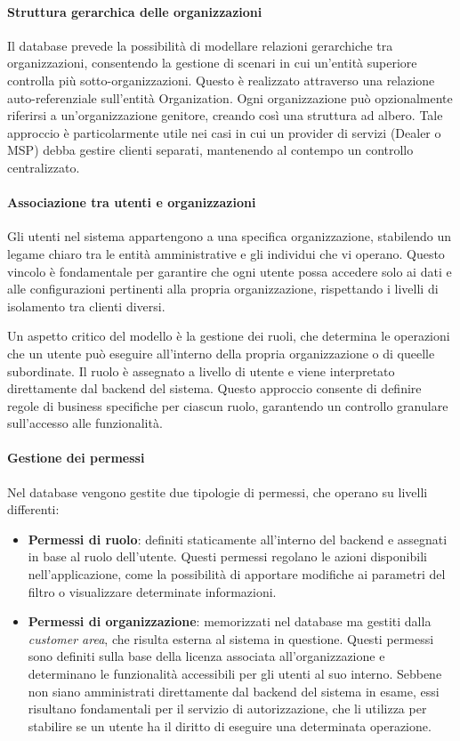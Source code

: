 \paragraph{Struttura gerarchica delle organizzazioni}
Il database prevede la possibilità di modellare relazioni gerarchiche tra organizzazioni, consentendo la gestione di scenari in cui un'entità superiore controlla più sotto-organizzazioni. Questo è realizzato attraverso una relazione auto-referenziale sull'entità Organization. Ogni organizzazione può opzionalmente riferirsi a un'organizzazione genitore, creando così una struttura ad albero. Tale approccio è particolarmente utile nei casi in cui un provider di servizi (Dealer o MSP) debba gestire clienti separati, mantenendo al contempo un controllo centralizzato.

\paragraph{Associazione tra utenti e organizzazioni}
Gli utenti nel sistema appartengono a una specifica organizzazione, stabilendo un legame chiaro tra le entità amministrative e gli individui che vi operano. Questo vincolo è fondamentale per garantire che ogni utente possa accedere solo ai dati e alle configurazioni pertinenti alla propria organizzazione, rispettando i livelli di isolamento tra clienti diversi.

Un aspetto critico del modello è la gestione dei ruoli, che determina le operazioni che un utente può eseguire all’interno della propria organizzazione o di queelle subordinate. Il ruolo è assegnato a livello di utente e viene interpretato direttamente dal backend del sistema. Questo approccio consente di definire regole di business specifiche per ciascun ruolo, garantendo un controllo granulare sull'accesso alle funzionalità.

\paragraph{Gestione dei permessi}
Nel database vengono gestite due tipologie di permessi, che operano su livelli differenti:
\begin{itemize}
  \item \textbf{Permessi di ruolo}: definiti staticamente all'interno del backend e assegnati in base al ruolo dell’utente. Questi permessi regolano le azioni disponibili nell’applicazione, come la possibilità di apportare modifiche ai parametri del filtro o visualizzare determinate informazioni.
  \item \textbf{Permessi di organizzazione}: memorizzati nel database ma gestiti dalla \textit{customer area}, che risulta esterna al sistema in questione. Questi permessi sono definiti sulla base della licenza associata all'organizzazione e determinano le funzionalità accessibili per gli utenti al suo interno. Sebbene non siano amministrati direttamente dal backend del sistema in esame, essi risultano fondamentali per il servizio di autorizzazione, che li utilizza per stabilire se un utente ha il diritto di eseguire una determinata operazione.
\end{itemize}

